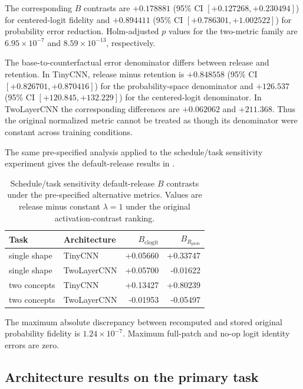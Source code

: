 The corresponding $B$ contrasts are $+0.178881$ (95\% CI $[+0.127268,+0.230494]$) for centered-logit fidelity and $+0.894411$ (95\% CI $[+0.786301,+1.002522]$) for probability error reduction. Holm-adjusted $p$ values for the two-metric family are $6.95\times10^{-7}$ and $8.59\times10^{-13}$, respectively.

The base-to-counterfactual error denominator differs between release and retention. In TinyCNN, release minus retention is $+0.848558$ (95\% CI $[+0.826701,+0.870416]$) for the probability-space denominator and $+126.537$ (95\% CI $[+120.845,+132.229]$) for the centered-logit denominator. In TwoLayerCNN the corresponding differences are $+0.062062$ and $+211.368$. Thus the original normalized metric cannot be treated as though its denominator were constant across training conditions.

The same pre-specified analysis applied to the schedule/task sensitivity experiment gives the default-release results in .

\begin{table}[h]
\caption{Schedule/task sensitivity default-release $B$ contrasts under the pre-specified alternative metrics. Values are release minus constant $\lambda=1$ under the original activation-contrast ranking.}
\label{tab:app-metric-sensitivity}
\centering
\small
\begin{tabular}{llrr}
\toprule
Task & Architecture & $B_{\mathrm{clogit}}$ & $B_{R_{\mathrm{prob}}}$ \\
\midrule
single shape & TinyCNN & +0.05660 & +0.33747 \\
single shape & TwoLayerCNN & +0.05700 & -0.01622 \\
two concepts & TinyCNN & +0.13427 & +0.80239 \\
two concepts & TwoLayerCNN & -0.01953 & -0.05497 \\
\bottomrule
\end{tabular}
\end{table}

The maximum absolute discrepancy between recomputed and stored original probability fidelity is $1.24\times10^{-7}$. Maximum full-patch and no-op logit identity errors are zero.

\subsection{Architecture results on the primary task}\label{app:architecture-primary}

